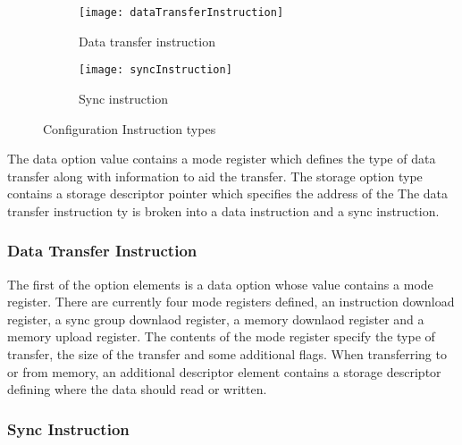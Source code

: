 \begin{figure}
\centering
  \begin{subfigure}{.85\textwidth}
    \centering
    \mbox{\texttt{[image: dataTransferInstruction]}}
    \captionsetup{justification=centering, skip=6pt}
    \caption{Data transfer instruction }
    \label{sec:Data transfer instruction}
  \end{subfigure}%

\bigskip

  \vspace{-35pt}
  \begin{subfigure}{0.85\textwidth}
    \centering
    \vspace{40pt}
    \texttt{[image: syncInstruction]}
    \captionsetup{justification=centering, skip=10pt}
    \caption{Sync instruction }
    \label{sec:Sync instruction}
  \end{subfigure}%
\captionsetup{justification=centering, skip=16pt}
\caption{Configuration Instruction types}
\label{sec:Configuration Instruction types}
\end{figure}

The data option value contains a mode register which defines the type of data transfer along with information to aid the transfer. The storage option type contains a storage descriptor pointer which specifies the address of the 
The data transfer instruction ty is broken into a data instruction and a sync instruction.

\subsubsection{Data Transfer Instruction}
\label{sec:Data Transfer Instruction}

The first of the option elements is a data option whose value contains a mode register.
There are currently four mode registers defined, an instruction download register, a sync group downlaod register, a memory downlaod register and a memory upload register.
The contents of the mode register specify the type of transfer, the size of the transfer and some additional flags.
When transferring to or from memory, an additional descriptor element contains a storage descriptor defining where the data should read or written.

\subsubsection{Sync Instruction}
\label{sec:Data Transfer Instruction}

